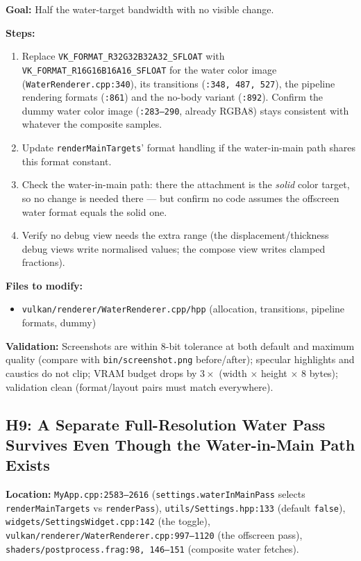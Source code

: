 \documentclass[11pt,a4paper]{article}
\begin{document}
\begin{tcolorbox}[promptbox={Prompt: Move the Water Color Target to RGBA16F}]
\textbf{Goal:} Half the water-target bandwidth with no visible change.

\textbf{Steps:}
\begin{enumerate}
    \item Replace \texttt{VK\_FORMAT\_R32G32B32A32\_SFLOAT} with \texttt{VK\_FORMAT\_R16G16B16A16\_SFLOAT} for the water
    color image (\texttt{WaterRenderer.cpp:340}), its transitions (\texttt{:348, 487, 527}), the pipeline rendering
    formats (\texttt{:861}) and the no-body variant (\texttt{:892}). Confirm the dummy water color image
    (\texttt{:283--290}, already RGBA8) stays consistent with whatever the composite samples.
    \item Update \texttt{renderMainTargets}' format handling if the water-in-main path shares this format constant.
    \item Check the water-in-main path: there the attachment is the \emph{solid} color target, so no change is needed
    there --- but confirm no code assumes the offscreen water format equals the solid one.
    \item Verify no debug view needs the extra range (the displacement/thickness debug views write normalised values;
    the compose view writes clamped fractions).
\end{enumerate}

\textbf{Files to modify:}
\begin{itemize}
    \item \texttt{vulkan/renderer/WaterRenderer.cpp/hpp} (allocation, transitions, pipeline formats, dummy)
\end{itemize}

\textbf{Validation:} Screenshots are within 8-bit tolerance at both default and maximum quality (compare with
\texttt{bin/screenshot.png} before/after); specular highlights and caustics do not clip; VRAM budget drops by
$3\times$ (width $\times$ height $\times$ 8 bytes); validation clean (format/layout pairs must match everywhere).
\end{tcolorbox}

\subsection{H9: A Separate Full-Resolution Water Pass Survives Even Though the Water-in-Main Path Exists}

\textbf{Location:} \texttt{MyApp.cpp:2583--2616} (\texttt{settings.waterInMainPass} selects
\texttt{renderMainTargets} vs \texttt{renderPass}), \texttt{utils/Settings.hpp:133} (default \texttt{false}),
\texttt{widgets/SettingsWidget.cpp:142} (the toggle), \texttt{vulkan/renderer/WaterRenderer.cpp:997--1120}
(the offscreen pass), \texttt{shaders/postprocess.frag:98, 146--151} (composite water fetches).
\end{document}
